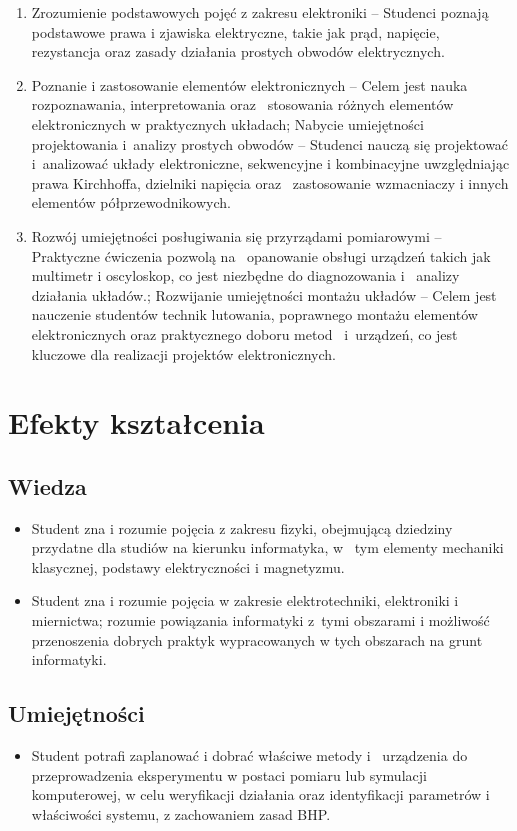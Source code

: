 \documentclass[12pt, a4paper]{article}
\begin{document}
\begin{enumerate}
  \item Zrozumienie podstawowych pojęć z zakresu elektroniki – Studenci poznają podstawowe prawa i zjawiska elektryczne, takie jak prąd, napięcie, rezystancja oraz zasady działania prostych obwodów elektrycznych.
  \item Poznanie i zastosowanie elementów elektronicznych – Celem jest nauka rozpoznawania, interpretowania oraz  stosowania różnych elementów elektronicznych w praktycznych układach; Nabycie umiejętności projektowania i analizy prostych obwodów – Studenci nauczą się projektować i analizować układy elektroniczne, sekwencyjne i kombinacyjne uwzględniając prawa Kirchhoffa, dzielniki napięcia oraz  zastosowanie wzmacniaczy i innych elementów półprzewodnikowych.
  \item Rozwój umiejętności posługiwania się przyrządami pomiarowymi – Praktyczne ćwiczenia pozwolą na  opanowanie obsługi urządzeń takich jak multimetr i oscyloskop, co jest niezbędne do diagnozowania i  analizy działania układów.; Rozwijanie umiejętności montażu układów – Celem jest nauczenie studentów technik lutowania, poprawnego montażu elementów elektronicznych oraz praktycznego doboru metod  i urządzeń, co jest kluczowe dla realizacji projektów elektronicznych.
\end{enumerate}

\section{Efekty kształcenia}

\subsection*{Wiedza}
\begin{itemize}
  \item Student zna i rozumie pojęcia z zakresu fizyki, obejmującą dziedziny przydatne dla studiów na kierunku informatyka, w  tym elementy mechaniki klasycznej, podstawy elektryczności i magnetyzmu.
  \item Student zna i rozumie pojęcia w zakresie elektrotechniki, elektroniki i miernictwa; rozumie powiązania informatyki z tymi obszarami i możliwość przenoszenia dobrych praktyk wypracowanych w tych obszarach na grunt informatyki.
\end{itemize}

\subsection*{Umiejętności}
\begin{itemize}
  \item Student potrafi zaplanować i dobrać właściwe metody i  urządzenia do przeprowadzenia eksperymentu w postaci pomiaru lub symulacji komputerowej, w celu weryfikacji działania oraz identyfikacji parametrów i właściwości systemu, z zachowaniem zasad BHP.
\end{itemize}
\end{document}
